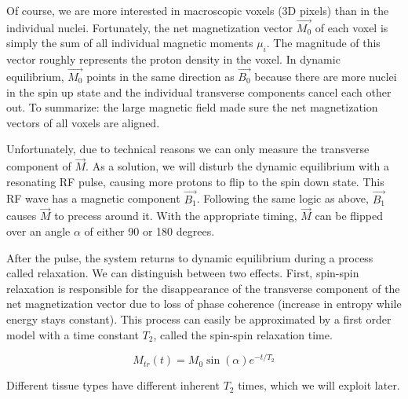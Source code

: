 Of course, we are more interested in macroscopic voxels (3D pixels) than in the
individual nuclei. Fortunately, the net magnetization vector $\vec{M_0}$ of each
voxel is simply the sum of all individual magnetic moments $\mu_i$. The
magnitude of this vector roughly represents the proton density in the voxel. In
dynamic equilibrium, $\vec{M_0}$ points in the same direction as $\vec{B_0}$
because there are more nuclei in the spin up state and the individual transverse
components cancel each other out. To summarize: the large magnetic field made
sure the net magnetization vectors of all voxels are aligned. 

Unfortunately, due to technical reasons we can only measure the transverse
component of $\vec{M}$. As a solution, we will disturb the dynamic equilibrium
with a resonating RF pulse, causing more protons to flip to the spin down state.
This RF wave has a magnetic component $\vec{B_1}$. Following the same logic as
above, $\vec{B_1}$ causes $\vec{M}$ to precess around it. With the appropriate
timing, $\vec{M}$ can be flipped over an angle $\alpha$ of either 90 or 180
degrees.

After the pulse, the system returns to dynamic equilibrium during a process
called relaxation. We can distinguish between two effects. First, spin-spin
relaxation is responsible for the disappearance of the transverse component of
the net magnetization vector due to loss of phase coherence (increase in
entropy while energy stays constant). This process can easily be approximated
by a first order model with a time constant $T_2$, called the spin-spin
relaxation time.

\begin{equation}
M_{tr}(t) = M_0 \sin(\alpha) e^{-t/T_2}
\end{equation}

Different tissue types have different inherent $T_2$ times, which we will
exploit later.

